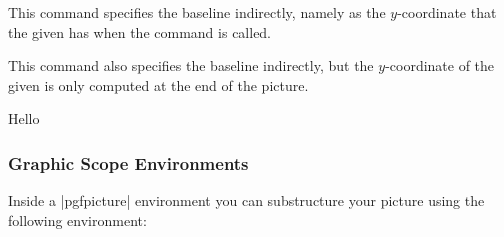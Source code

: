\begin{command}{\pgfsetbaselinepointnow{}}
    This command specifies the baseline indirectly, namely as the
    $y$-coordinate that the given  has when the command is called.
\end{command}

\begin{command}{\pgfsetbaselinepointlater{}}
    This command also specifies the baseline indirectly, but the $y$-coordinate
    of the given  is only computed at the end of the picture.
\begin{codeexample}[preamble={\usetikzlibrary{shapes.misc}}]
Hello
\begin{pgfpicture}
\end{pgfpicture}
\end{codeexample}
\end{command}


\subsubsection{Graphic Scope Environments}

Inside a |{pgfpicture}| environment you can substructure your picture using the
following environment:

